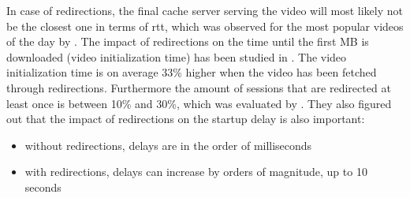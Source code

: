 In case of redirections, the final cache server serving the video will most likely not be the closest one in terms of \gls{rtt}, which was observed for the most popular videos of the day by \cite{inp:network_characteristics}. The impact of redirections on the time until the first MB is downloaded (video initialization time) has been studied in \cite{inpr:vivisecting_youtube}. The video initialization time is on average 33\% higher when the video has been fetched through redirections. Furthermore the amount of sessions that are redirected at least once is between 10\% and 30\%, which was evaluated by \cite{inpr:youtube_everywhere}. They also figured out that the impact of redirections on the startup delay is also important:

\begin{itemize}
  \item without redirections, delays are in the order of milliseconds
  \item with redirections, delays can increase by orders of magnitude, up to 10 seconds
\end{itemize}

